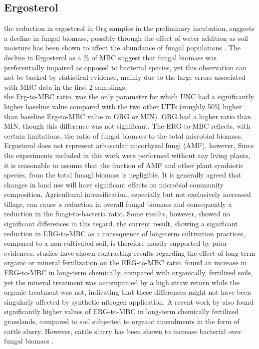 	\subsection{Ergosterol}
	the reduction in ergosterol in Org samples in the preliminary incubation, suggests a decline in fungal biomass, possibly through the effect of water addition as soil moisture has been shown to affect the abundance of fungal populations \citep{drenovsky2004, griffin1963}. The decline in Ergosterol as a \% of MBC suggest that fungal biomass was preferentially impaired as opposed to bacterial species, yet this observation can not be backed by statistical evidence, mainly due to the large errors associated with MBC data in the first 2 samplings.\\
	the Erg-to-MBC ratio, was the only parameter for which UNC had a significantly higher baseline value compared with the two other LTTs (roughly 50\% higher than baseline Erg-to-MBC value in ORG or MIN).
	ORG had a higher ratio than MIN, though this difference was not significant. The ERG-to-MBC reflects, with certain limitations, the ratio of fungal biomass to the total microbial biomass. Ergosterol does not represent arbuscular micorhyzal fungi (AMF), however, Since the experiments included in this work were performed without any living plants, it is reasonable to assume that the fraction of AMF and other plant symbiotic species, from the total funagl biomass is negligible.
	It is generally agreed that changes in land use will have significant effects on microbial community composition. Agricultural intensification, especially but not exclusively increased tillage, can cause a reduction in overall fungal biomass and consequently a reduction in the fungi-to-bacteria ratio. Some results, however, showed no significant differences in this regard.
	the current result, showing a significant reduction in ERG-to-MBC as a consequence of long-term cultivation practices, compared to a non-cultivated soil, is therefore mostly supported by prior evidences.
	studies have shown contrasting results regarding the effect of long-term organic or mineral fertilization on the ERG-to-MBC ratio. \citet{heinze2010} found an increase in ERG-to-MBC in long-term chemically, compared with organically, fertilized soils, yet the mineral treatment was accompanied by a high straw return while the organic treatment was not, indicating that these differences might not have been  singularly affected by synthetic nitrogen application. A recent work by \citet{knoblauch2017} also found significantly higher values of ERG-to-MBC in long-term chemically fertilized grasslands, compared to soil subjected to organic amendments in the form of cattle slurry. However, cattle slurry has been shown to increase bacterial over fungal biomass \citet{knoblauch2017}.
